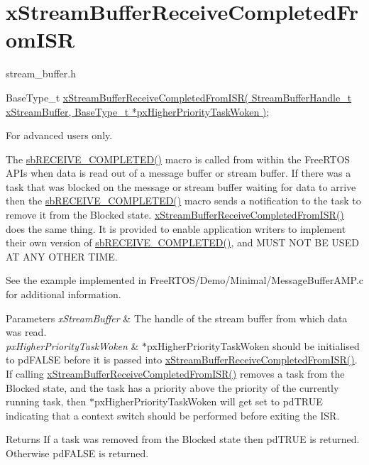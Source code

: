 \hypertarget{group__xStreamBufferReceiveCompletedFromISR}{}\section{x\+Stream\+Buffer\+Receive\+Completed\+From\+I\+SR}
\label{group__xStreamBufferReceiveCompletedFromISR}
stream\+\_\+buffer.\+h


\begin{DoxyPre}
BaseType\_t \hyperlink{stream__buffer_8h_ac12e93e96e0eafbc0e981d00e7275d32}{xStreamBufferReceiveCompletedFromISR( StreamBufferHandle\_t xStreamBuffer, BaseType\_t *pxHigherPriorityTaskWoken )};
\end{DoxyPre}


For advanced users only.

The \hyperlink{stream__buffer_8c_a4d6a29d283acfa2d4ef576476eedc789}{sb\+R\+E\+C\+E\+I\+V\+E\+\_\+\+C\+O\+M\+P\+L\+E\+T\+E\+D()} macro is called from within the Free\+R\+T\+OS A\+P\+Is when data is read out of a message buffer or stream buffer. If there was a task that was blocked on the message or stream buffer waiting for data to arrive then the \hyperlink{stream__buffer_8c_a4d6a29d283acfa2d4ef576476eedc789}{sb\+R\+E\+C\+E\+I\+V\+E\+\_\+\+C\+O\+M\+P\+L\+E\+T\+E\+D()} macro sends a notification to the task to remove it from the Blocked state. \hyperlink{stream__buffer_8h_ac12e93e96e0eafbc0e981d00e7275d32}{x\+Stream\+Buffer\+Receive\+Completed\+From\+I\+S\+R()} does the same thing. It is provided to enable application writers to implement their own version of \hyperlink{stream__buffer_8c_a4d6a29d283acfa2d4ef576476eedc789}{sb\+R\+E\+C\+E\+I\+V\+E\+\_\+\+C\+O\+M\+P\+L\+E\+T\+E\+D()}, and M\+U\+ST N\+OT BE U\+S\+ED AT A\+NY O\+T\+H\+ER T\+I\+ME.

See the example implemented in Free\+R\+T\+O\+S/\+Demo/\+Minimal/\+Message\+Buffer\+A\+M\+P.\+c for additional information.


\begin{DoxyParams}{Parameters}
{\em x\+Stream\+Buffer} & The handle of the stream buffer from which data was read.\\
\hline
{\em px\+Higher\+Priority\+Task\+Woken} & $\ast$px\+Higher\+Priority\+Task\+Woken should be initialised to pd\+F\+A\+L\+SE before it is passed into \hyperlink{stream__buffer_8h_ac12e93e96e0eafbc0e981d00e7275d32}{x\+Stream\+Buffer\+Receive\+Completed\+From\+I\+S\+R()}. If calling \hyperlink{stream__buffer_8h_ac12e93e96e0eafbc0e981d00e7275d32}{x\+Stream\+Buffer\+Receive\+Completed\+From\+I\+S\+R()} removes a task from the Blocked state, and the task has a priority above the priority of the currently running task, then $\ast$px\+Higher\+Priority\+Task\+Woken will get set to pd\+T\+R\+UE indicating that a context switch should be performed before exiting the I\+SR.\\
\hline
\end{DoxyParams}
\begin{DoxyReturn}{Returns}
If a task was removed from the Blocked state then pd\+T\+R\+UE is returned. Otherwise pd\+F\+A\+L\+SE is returned. 
\end{DoxyReturn}
